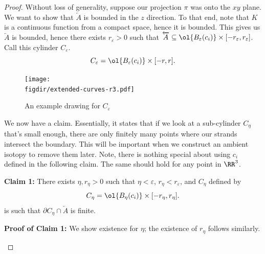 \begin{proof}
  Without loss of generality, suppose our projection $\pi$ was onto
  the $xy$ plane. We want to show that $\overleftarrow{A}$ is bounded
  in the $z$ direction. To that end, note that $K$ is a continuous
  function from a compact space, hence it is bounded. This gives us
  $\overleftarrow{A}$ is bounded, hence there exists $r_\varepsilon >
  0$ such that $\overleftarrow{A} \subseteq \ol{B_{\varepsilon}(c_i)}
  \times [-r_\varepsilon, r_\varepsilon] $. Call this cylinder
  $C_\varepsilon$.
  \[
    C_\varepsilon = \ol{B_{\varepsilon}(c_i)} \times [-r, r].
  \]
  \begin{figure}[H]
    \centering
    \texttt{[image: \\figdir/extended-curves-r3.pdf]}
    \caption{An example drawing for $C_\varepsilon$}
  \end{figure}


  We now have a claim. Essentially, it states that if we look at a
  sub-cylinder $C_\eta$ that's small enough, there are only finitely
  many points where our strands intersect the boundary. This will be
  important when we construct an ambient isotopy to remove them later.
  Note, there is nothing special about using $c_i$ defined in the
  following claim. The same should hold for any point in $\RR^3$.

  \begin{leftbar}

    \noindent \textbf{Claim 1:} There exists $\eta, r_\eta > 0$ such
    that $\eta < \varepsilon$, $r_\eta < r_\varepsilon$, and $C_\eta$
    defined by %
    \[
      C_\eta = \ol{B_{\eta}(c_i)} \times [-r_\eta, r_\eta].
    \]
    is such that $\partial C_\eta \cap \overleftarrow{A}$ is finite.

    \noindent \textbf{Proof of Claim 1:} We show existence for $\eta$;
    the existence of $r_\eta$ follows similarly.


\end{leftbar}
\end{proof}
